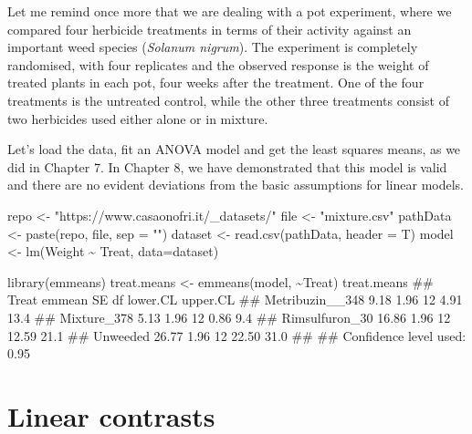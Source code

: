 \documentclass[a4paper,12pt,oneside]{book}
\newenvironment{Shaded}{\begin{snugshade}}{\end{snugshade}}
\newcommand{\SpecialCharTok}[1]{#1}
\newcommand{\StringTok}[1]{#1}
\newcommand{\DocumentationTok}[1]{#1}
\newcommand{\OtherTok}[1]{#1}
\newcommand{\FunctionTok}[1]{#1}
\newcommand{\AttributeTok}[1]{#1}
\newcommand{\NormalTok}[1]{#1}
\begin{document}
Let me remind once more that we are dealing with a pot experiment, where we compared four herbicide treatments in terms of their activity against an important weed species (\emph{Solanum nigrum}). The experiment is completely randomised, with four replicates and the observed response is the weight of treated plants in each pot, four weeks after the treatment. One of the four treatments is the untreated control, while the other three treatments consist of two herbicides used either alone or in mixture.

Let's load the data, fit an ANOVA model and get the least squares means, as we did in Chapter 7. In Chapter 8, we have demonstrated that this model is valid and there are no evident deviations from the basic assumptions for linear models.

\vspace{12pt}

\begin{Shaded}
\begin{Highlighting}[]
\NormalTok{repo }\OtherTok{\textless{}{-}} \StringTok{"https://www.casaonofri.it/\_datasets/"}
\NormalTok{file }\OtherTok{\textless{}{-}} \StringTok{"mixture.csv"}
\NormalTok{pathData }\OtherTok{\textless{}{-}} \FunctionTok{paste}\NormalTok{(repo, file, }\AttributeTok{sep =} \StringTok{""}\NormalTok{)}
\NormalTok{dataset }\OtherTok{\textless{}{-}} \FunctionTok{read.csv}\NormalTok{(pathData, }\AttributeTok{header =}\NormalTok{ T)}
\NormalTok{model }\OtherTok{\textless{}{-}} \FunctionTok{lm}\NormalTok{(Weight }\SpecialCharTok{\textasciitilde{}}\NormalTok{ Treat, }\AttributeTok{data=}\NormalTok{dataset)}

\FunctionTok{library}\NormalTok{(emmeans)}
\NormalTok{treat.means }\OtherTok{\textless{}{-}} \FunctionTok{emmeans}\NormalTok{(model, }\SpecialCharTok{\textasciitilde{}}\NormalTok{Treat)}
\NormalTok{treat.means}
\DocumentationTok{\#\#  Treat           emmean   SE df lower.CL upper.CL}
\DocumentationTok{\#\#  Metribuzin\_\_348   9.18 1.96 12     4.91     13.4}
\DocumentationTok{\#\#  Mixture\_378       5.13 1.96 12     0.86      9.4}
\DocumentationTok{\#\#  Rimsulfuron\_30   16.86 1.96 12    12.59     21.1}
\DocumentationTok{\#\#  Unweeded         26.77 1.96 12    22.50     31.0}
\DocumentationTok{\#\# }
\DocumentationTok{\#\# Confidence level used: 0.95}
\end{Highlighting}
\end{Shaded}

\hypertarget{linear-contrasts}{%
\section{Linear contrasts}\label{linear-contrasts}}
\end{document}
